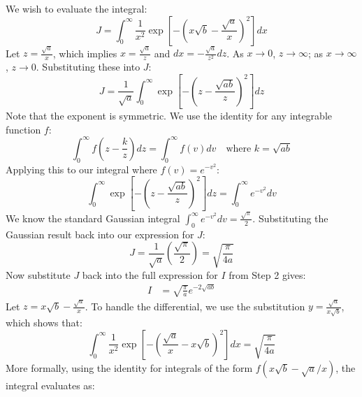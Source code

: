 \documentclass[12pt]{article}
\begin{document}
\begin{singlespace}
\begin{equation}
\end{equation}
We wish to evaluate the integral:
\begin{equation}
J = \int_{0}^{\infty} \frac{1}{x^2} \exp\left[ -\left(x\sqrt{b} - \frac{\sqrt{a}}{x}\right)^2 \right] dx
\end{equation}
Let $z = \frac{\sqrt{a}}{x}$, which implies $x = \frac{\sqrt{a}}{z}$ and $dx = -\frac{\sqrt{a}}{z^2} dz$.
As $x \to 0$, $z \to \infty$; as $x \to \infty$, $z \to 0$. Substituting these into $J$:
\begin{equation}
J = \frac{1}{\sqrt{a}} \int_{0}^{\infty} \exp\left[ -\left(z - \frac{\sqrt{ab}}{z}\right)^2 \right] dz
\end{equation}
Note that the exponent is symmetric. We use the identity for any integrable function $f$:
\begin{equation}
\int_{0}^{\infty} f\left( z - \frac{k}{z} \right) dz = \int_{0}^{\infty} f(v) dv \quad \text{where } k = \sqrt{ab}
\end{equation}
Applying this to our integral where $f(v) = e^{-v^2}$:
\begin{equation}
\int_{0}^{\infty} \exp\left[ -\left(z - \frac{\sqrt{ab}}{z}\right)^2 \right] dz = \int_{0}^{\infty} e^{-v^2} dv
\end{equation}
We know the standard Gaussian integral $\int_{0}^{\infty} e^{-v^2} dv = \frac{\sqrt{\pi}}{2}$. Substituting the Gaussian result back into our expression for $J$:
\begin{equation}
J = \frac{1}{\sqrt{a}} \left( \frac{\sqrt{\pi}}{2} \right) = \sqrt{\frac{\pi}{4a}}
\end{equation}
Now substitute $J$ back into the full expression for $I$ from Step 2 gives:
\begin{align}
I &= \sqrt{\frac{\pi}{a}} e^{-2\sqrt{ab}}
\end{align}
Let $z = x\sqrt{b} - \frac{\sqrt{a}}{x}$. To handle the differential, we use the substitution $y = \frac{\sqrt{a}}{x\sqrt{b}}$, which shows that:
\begin{equation}
\int_{0}^{\infty} \frac{1}{x^2} \exp\left[ -\left(\frac{\sqrt{a}}{x} - x\sqrt{b}\right)^2 \right] dx = \sqrt{\frac{\pi}{4a}}
\end{equation}
More formally, using the identity for integrals of the form $f(x\sqrt{b} - \sqrt{a}/x)$, the integral evaluates as:
\begin{equation}

\end{equation}
\end{singlespace}
\end{document}
